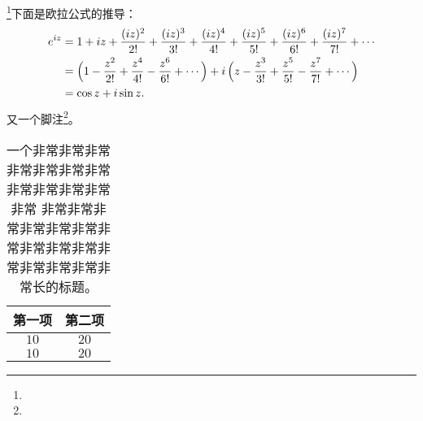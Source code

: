 \documentclass[no-math,a4paper]{ctexart}
\begin{document}
\zhlipsum*[1]\footnote{\zhlipsum*[2]}下面是欧拉公式的推导：
\begin{align}
e^{i z} & = 1 + i z + \frac{(i z)^2}{2!} + \frac{(i z)^3}{3!}
     + \frac{(i z)^4}{4!} + \frac{(i z)^5}{5!}
     + \frac{(i z)^6}{6!} + \frac{(i z)^7}{7!} + \dotsb \\
 & = \Bigl( 1 - \frac{z^2}{2!} + \frac{z^4}{4!}
       - \frac{z^6}{6!} + \dotsb \Bigr)
     + i \, \Bigl( z - \frac{z^3}{3!} + \frac{z^5}{5!}
       - \frac{z^7}{7!} + \dotsb \Bigr) \\
 & = \cos z + i \sin z.
\end{align}
又一个脚注\footnote{\zhlipsum*[3]}。
\begin{table}[ht]
\centering
\caption[短标题]{一个非常非常非常非常非常非常非常非常非常非常非常非常
  非常非常非常非常非常非常非常非常非常非常非常非常非常非常非常长的标题。}
\begin{tabular}{c c}
\toprule
第一项 & 第二项 \\
\midrule
 $10$ & $20$ \\
 $10$ & $20$ \\
\bottomrule
\end{tabular}
\end{table}
\zhlipsum[4]
\begin{quotation}
\linespread{1.05}\selectfont
\blindtext
\end{quotation}
\zhlipsum[5]
\end{document}
